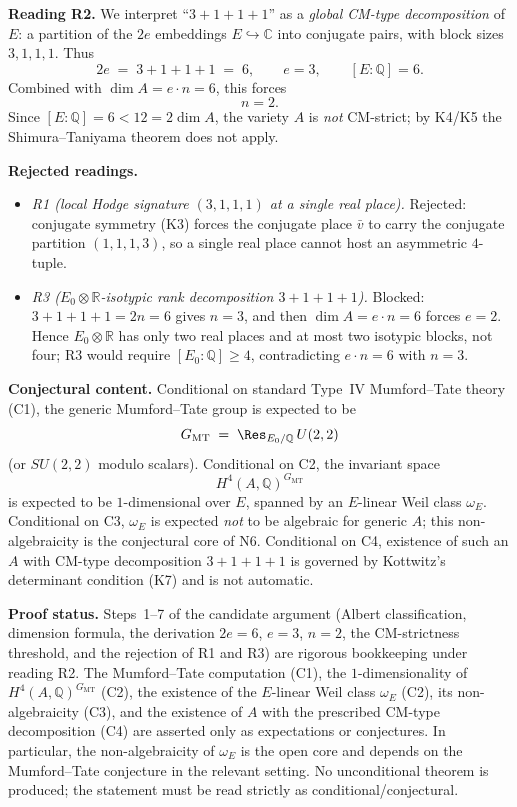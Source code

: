 \documentclass{article}
\begin{document}
\medskip
\noindent\textbf{Reading R2.} We interpret ``\(3+1+1+1\)'' as a \emph{global CM-type decomposition} of \(E\): a partition of the \(2e\) embeddings \(E\hookrightarrow\mathbb{C}\) into conjugate pairs, with block sizes \(3,1,1,1\). Thus
\[
2e \;=\; 3+1+1+1 \;=\; 6,\qquad e = 3,\qquad [E:\mathbb{Q}] = 6.
\]
Combined with \(\dim A = e\cdot n = 6\), this forces
\[
n = 2.
\]
Since \([E:\mathbb{Q}] = 6 < 12 = 2\dim A\), the variety \(A\) is \emph{not} CM-strict; by K4/K5 the Shimura--Taniyama theorem does not apply.

\medskip
\noindent\textbf{Rejected readings.}
\begin{itemize}
\item \emph{R1 (local Hodge signature \((3,1,1,1)\) at a single real place).} Rejected: conjugate symmetry (K3) forces the conjugate place \(\bar v\) to carry the conjugate partition \((1,1,1,3)\), so a single real place cannot host an asymmetric \(4\)-tuple.
\item \emph{R3 (\(E_{0}\otimes\mathbb{R}\)-isotypic rank decomposition \(3+1+1+1\)).} Blocked: \(3+1+1+1 = 2n = 6\) gives \(n = 3\), and then \(\dim A = e\cdot n = 6\) forces \(e = 2\). Hence \(E_{0}\otimes\mathbb{R}\) has only two real places and at most two isotypic blocks, not four; R3 would require \([E_{0}:\mathbb{Q}]\ge 4\), contradicting \(e\cdot n = 6\) with \(n = 3\).
\end{itemize}

\medskip
\noindent\textbf{Conjectural content.} Conditional on standard Type~IV Mumford--Tate theory (C1), the generic Mumford--Tate group is expected to be
\[
G_{\mathrm{MT}} \;=\; \Res_{E_{0}/\mathbb{Q}}\, U(2,2)
\]
(or \(SU(2,2)\) modulo scalars). Conditional on C2, the invariant space
\[
H^{4}(A,\mathbb{Q})^{G_{\mathrm{MT}}}
\]
is expected to be \(1\)-dimensional over \(E\), spanned by an \(E\)-linear Weil class \(\omega_{E}\). Conditional on C3, \(\omega_{E}\) is expected \emph{not} to be algebraic for generic \(A\); this non-algebraicity is the conjectural core of N6. Conditional on C4, existence of such an \(A\) with CM-type decomposition \(3+1+1+1\) is governed by Kottwitz's determinant condition (K7) and is not automatic.

\medskip
\noindent\textbf{Proof status.} Steps~1--7 of the candidate argument (Albert classification, dimension formula, the derivation \(2e=6\), \(e=3\), \(n=2\), the CM-strictness threshold, and the rejection of R1 and R3) are rigorous bookkeeping under reading R2. The Mumford--Tate computation (C1), the \(1\)-dimensionality of \(H^{4}(A,\mathbb{Q})^{G_{\mathrm{MT}}}\) (C2), the existence of the \(E\)-linear Weil class \(\omega_{E}\) (C2), its non-algebraicity (C3), and the existence of \(A\) with the prescribed CM-type decomposition (C4) are asserted only as expectations or conjectures. In particular, the non-algebraicity of \(\omega_{E}\) is the open core and depends on the Mumford--Tate conjecture in the relevant setting. No unconditional theorem is produced; the statement must be read strictly as conditional/conjectural.
\end{document}
